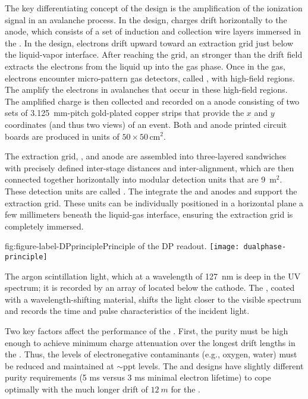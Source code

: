 The key differentiating concept of the  design is the amplification of the ionization signal in an avalanche process. In the  design, charges drift horizontally to the anode, which consists of a set of induction and collection wire layers immersed in the . In the  design, electrons drift upward toward an extraction grid just below the liquid-vapor interface. After reaching the grid, an \efield stronger than the drift field extracts the electrons from the liquid up into the gas phase. Once in the gas, electrons encounter micro-pattern gas detectors, called , with high-field regions. The  amplify the electrons in avalanches that occur in these high-field regions. The amplified charge is then collected and recorded on a \twod anode consisting of two sets of \SI{3.125}{mm}-pitch gold-plated copper strips that provide the $x$ and $y$ coordinates (and thus two views) of an event. Both  and anode printed circuit boards are produced in units of $50 \times 50\, $cm$^2$. 

The extraction grid, , and anode are assembled into three-layered sandwiches with precisely defined inter-stage distances and inter-alignment,  which are then connected together horizontally into modular detection units that are \num{9}~m$^2$. These detection units are called . The  integrate the  and anodes and support the extraction grid. These units can be individually positioned in a horizontal plane a few millimeters beneath the liquid-gas interface, ensuring the extraction grid is completely immersed. 

\begin{dunefigure}{fig:figure-label-DPprinciple}{Principle of the DP readout.}
\texttt{[image: dualphase-principle]}
\end{dunefigure}

The argon scintillation light, which at a wavelength of  \SI{127}{nm} is deep in the UV spectrum; it is recorded by an array of  located below the cathode.  The , coated with a wavelength-shifting material, shifts the light  closer to the visible spectrum and records the time and pulse characteristics of the incident light.

Two key factors affect the performance of the .  First, the  purity must be high enough to achieve minimum charge attenuation over the longest drift lengths in the .  Thus, the levels of electronegative contaminants (e.g., oxygen, water) must be reduced and
maintained at $\sim$ppt levels.  The  and  designs have slightly different purity requirements (5 ms versus 3 ms minimal electron lifetime) to  cope optimally with the much longer drift of $12~m$ for the .

